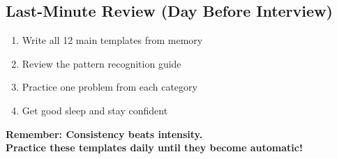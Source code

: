 \documentclass[10pt,a4paper]{article}
\begin{document}
\subsection{Last-Minute Review (Day Before Interview)}
\begin{enumerate}
\item Write all 12 main templates from memory
\item Review the pattern recognition guide
\item Practice one problem from each category
\item Get good sleep and stay confident
\end{enumerate}

\vspace{1cm}
\begin{center}
\textbf{\Large Remember: Consistency beats intensity.}\\
\textbf{\Large Practice these templates daily until they become automatic!}
\end{center}
\end{document}
